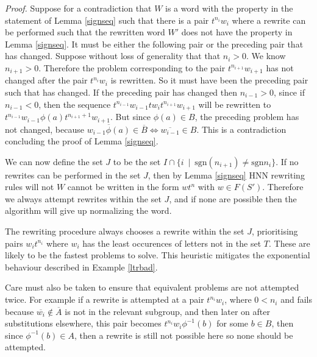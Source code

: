 \documentclass[12pt]{article} %
\theoremstyle{definition}
\theoremstyle{definition}
\theoremstyle{definition}
\newtheorem{lemma}{Lemma}[theorem]
\theoremstyle{definition}
\theoremstyle{definition}
\theoremstyle{definition}
\begin{document}
\textit{Proof.}
Suppose for a contradiction that
$W$ is a word with the property in the statement of Lemma \ref{signseq}
such that there is a pair $t^{n_i}w_i$ where a rewrite can be performed such that
the rewritten word $W'$ does not have the property in Lemma \ref{signseq}.
It must be either the following pair or the preceding pair that has changed.
Suppose without loss of generality that that $n_i > 0$. We know $n_{i+1} > 0$.
Therefore the problem corresponding to the pair $t^{n_{i+1}}w_{i+1}$ has not changed
after the pair $t^{n_i}w_i$ is rewritten. So it must have been the preceding pair
such that has changed. If the preceding pair has changed then $n_{i - 1} > 0$, since if
$n_{i-1} < 0$, then the sequence $t^{n_{i-1}}w_{i - 1} t w_i t^{n_{i+1}} w_{i+1}$
will be rewritten to $t^{n_{i-1}}w_{i-1} \phi(a) t^{n_{i + 1} + 1}w_{i+1}$.
But since $\phi(a) \in B$, the preceding problem has not changed, because
$\overline{w_{i-1} \phi(a)} \in \overline{B} \iff \overline{w_{i-1}} \in B$.
This is a contradiction concluding the proof of Lemma \ref{signseq}.

We can now define the set $J$ to be the set
$I \cap \{i \ \mid \ \text{sgn}(n_{i+1}) \ne \text{sgn}{n_i} \}$. If no rewrites
can be performed in the set $J$, then by Lemma \ref{signseq} HNN rewriting rules
will not $W$ cannot be written in the form
$w t^n$ with $w \in F(S')$. Therefore we always attempt rewrites within the set $J$,
and if none are possible then the algorithm will give up normalizing the word.

The rewriting procedure always chooses a rewrite within the set $J$, prioritising
pairs $w_it^{n_i}$ where $w_i$ has the least occurences of letters not in
the set $T$. These are likely to be the fastest problems to solve.
This heuristic mitigates the exponential behaviour described in Example \ref{ltrbad}.

Care must also be taken to ensure that equivalent problems are not attempted twice.
For example if a rewrite is attempted at a pair $t^{n_i}w_i$, where $0 < n_i$
and fails because $\overline{w_i} \notin \overline{A}$ is not in the relevant subgroup,
and then later on after substitutions elsewhere, this pair becomes
$t^{n_i}w_i\phi^{-1}(b)$ for some $b \in B$, then since $\phi^{-1}(b) \in A$, then a rewrite
is still not possible here so none should be attempted.



\end{document}
